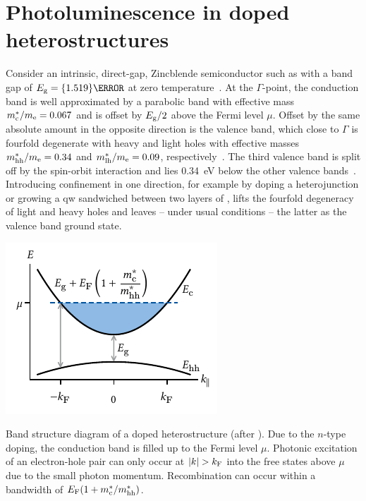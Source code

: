 \section{Photoluminescence in doped \GaAsAlGaAs heterostructures}\label{sec:exp:theory:pl}
Consider an intrinsic, direct-gap, Zincblende semiconductor such as  with a band gap of $E_{\mr{g}} = \qty{1.519}{\electronvolt}$ at zero temperature~\cite{Vurgaftman2001}.
At the $\Gamma$-point, the conduction band is well approximated by a parabolic band with effective mass $m^\ast_{\mathrm{c}}/m_{\mathrm{e}} = 0.067$ and is offset by $E_{\mathrm{g}}/2$ above the Fermi level $\mu$.
Offset by the same absolute amount in the opposite direction is the valence band, which close to $\Gamma$ is fourfold degenerate with heavy and light holes with effective masses $m^{\ast}_{\mathrm{hh}}/m_{\mathrm{e}} = 0.34$ and $m^{\ast}_{\mathrm{lh}}/m_{\mathrm{e}} = 0.09$, respectively~\cite{Miller1984a}.
The third valence band
is split off by the spin-orbit interaction and lies \qty{0.34}{\electronvolt} below the other valence bands~\cite{Davies2009}.
Introducing confinement in one direction, for example by doping a \GaAsAlGaAs heterojunction or growing a  \gls{qw} sandwiched between two layers of , lifts the fourfold degeneracy of light and heavy holes and leaves -- under usual conditions -- the latter as the valence band ground state.

\begin{marginfigure}
    \centering
    \includegraphics{img/pdf/experiment/2deg_sketch}
    \caption[]{
        Band structure diagram of a doped heterostructure (after ).
        Due to the $n$-type doping, the conduction band is filled up to the Fermi level $\mu$.
        Photonic excitation of an electron-hole pair can only occur at $\abs{k} > k_{\mathrm{F}}$ into the free states above $\mu$ due to the small photon momentum.
        Recombination can occur within a bandwidth of $E_{\mathrm{F}}(1 + m^\ast_{\mathrm{c}}/m^\ast_{\mathrm{hh}})$.
    }
    \label{fig:exp:theory:bandstructure:doped}
\end{marginfigure}

